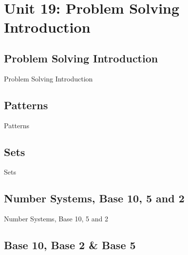 \chapter{Unit 19: Problem Solving Introduction}
\label{chap:unit19}

\section{Problem Solving Introduction}
\label{sec:problem-solving-introduction}

Problem Solving Introduction

\section{Patterns}
\label{sec:patterns}

Patterns

\section{Sets}
\label{sec:sets}

Sets

\section{Number Systems, Base 10, 5 and 2}
\label{sec:number-systems-base-10-5-and-2}

Number Systems, Base 10, 5 and 2

\section{Base 10, Base 2 \& Base 5}
\label{sec:base-10-base-2-base-5}

